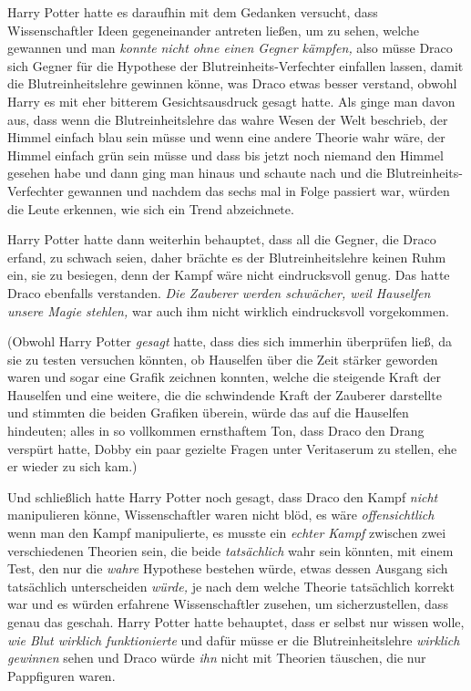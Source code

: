 {Harry Potter hatte es daraufhin mit dem Gedanken versucht, dass Wissenschaftler Ideen gegeneinander antreten ließen, um zu sehen, welche gewannen und man \emph{konnte} \emph{nicht ohne einen Gegner kämpfen,} also müsse Draco sich Gegner für die Hypothese der Blutreinheits-Verfechter einfallen lassen, damit die Blutreinheitslehre gewinnen könne, was Draco etwas besser verstand, obwohl Harry es mit eher bitterem Gesichtsausdruck gesagt hatte. Als ginge man davon aus, dass wenn die Blutreinheitslehre das wahre Wesen der Welt beschrieb, der Himmel einfach blau sein müsse und wenn eine andere Theorie wahr wäre, der Himmel einfach grün sein müsse und dass bis jetzt noch niemand den Himmel gesehen habe und dann ging man hinaus und schaute nach und die Blutreinheits-Verfechter gewannen und nachdem das sechs mal in Folge passiert war, würden die Leute erkennen, wie sich ein Trend abzeichnete.

Harry Potter hatte dann weiterhin behauptet, dass all die Gegner, die Draco erfand, zu schwach seien, daher brächte es der Blutreinheitslehre keinen Ruhm ein, sie zu besiegen, denn der Kampf wäre nicht eindrucksvoll genug. Das hatte Draco ebenfalls verstanden. \emph{Die Zauberer werden schwächer, weil Hauselfen unsere Magie stehlen,} war auch ihm nicht wirklich eindrucksvoll vorgekommen.

(Obwohl Harry Potter \emph{gesagt} hatte, dass dies sich immerhin überprüfen ließ, da sie zu testen versuchen könnten, ob Hauselfen über die Zeit stärker geworden waren und sogar eine Grafik zeichnen konnten, welche die steigende Kraft der Hauselfen und eine weitere, die die schwindende Kraft der Zauberer darstellte und stimmten die beiden Grafiken überein, würde das auf die Hauselfen hindeuten; alles in so vollkommen ernsthaftem Ton, dass Draco den Drang verspürt hatte, Dobby ein paar gezielte Fragen unter Veritaserum zu stellen, ehe er wieder zu sich kam.)

Und schließlich hatte Harry Potter noch gesagt, dass Draco den Kampf \emph{nicht} manipulieren könne, Wissenschaftler waren nicht blöd, es wäre \emph{offensichtlich} wenn man den Kampf manipulierte, es musste ein \emph{echter Kampf} zwischen zwei verschiedenen Theorien sein, die beide \emph{tatsächlich} wahr sein könnten, mit einem Test, den nur die \emph{wahre} Hypothese bestehen würde, etwas dessen Ausgang sich tatsächlich unterscheiden \emph{würde,} je nach dem welche Theorie tatsächlich korrekt war und es würden erfahrene Wissenschaftler zusehen, um sicherzustellen, dass genau das geschah. Harry Potter hatte behauptet, dass er selbst nur wissen wolle, \emph{wie Blut wirklich funktionierte} und dafür müsse er die Blutreinheitslehre \emph{wirklich} \emph{gewinnen} sehen und Draco würde \emph{ihn} nicht mit Theorien täuschen, die nur Pappfiguren waren.

}
